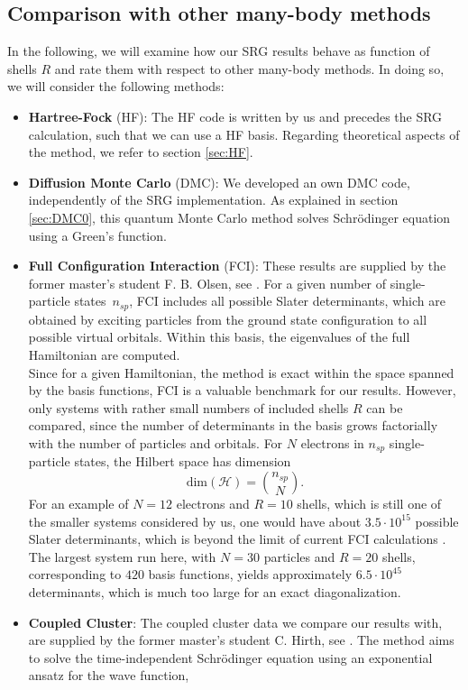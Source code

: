 \subsection{Comparison with other many-body methods}
In the following, we will examine how our SRG results behave as function of shells $R$ and rate them with respect to other many-body methods. In doing so, we will consider the following methods: 
\begin{itemize}
\item \textbf{Hartree-Fock} (HF): The HF code is written by us and precedes the SRG calculation, such that we can use a HF basis. Regarding theoretical aspects of the method, we refer to section \ref{sec:HF}.
\item \textbf{Diffusion Monte Carlo} (DMC): We developed an own DMC code, independently of the SRG implementation. As explained in section \ref{sec:DMC0}, this quantum Monte Carlo method solves Schr\"odinger equation using a Green's function.
\item \textbf{Full Configuration Interaction} (FCI): These results are supplied by the former master's student F. B. Olsen, see \cite{Frank}. For a given number of single-particle \mbox{states $n_{sp}$}, FCI includes all  possible Slater determinants, which are obtained by exciting
 particles from the ground state configuration to all possible virtual orbitals.  Within this basis, the eigenvalues of the full Hamiltonian are computed. \\
 Since for a given Hamiltonian, the method is exact within the space spanned by the basis functions, FCI is a valuable benchmark for our results. However, only systems with rather small numbers of included shells $R$ can be compared, since the number of determinants in the basis grows factorially with the number of particles and orbitals. For $N$ electrons in $n_{sp}$ single-particle states, the Hilbert space has dimension
 \[
 \text{dim}(\mathcal{H}) = \binom{n_{sp}}{N}.
 \]
For an example of $N=12$ electrons and $R=10$ shells, which is still one of the smaller systems considered by us, one would have about $3.5\cdot 10^{15}$ possible Slater determinants, which is beyond the limit of current FCI calculations \cite{Shimizu:2012rt}. The largest system run here, with $N=30$ particles and $R=20$ shells, corresponding to $420$ basis functions, yields approximately $6.5\cdot 10^{45}$ determinants, which is much too large for an exact diagonalization.
\item \textbf{Coupled Cluster}: The coupled cluster data we compare our results with, are supplied by the former master's student C. Hirth, see \cite{Christoffer}. The method aims to solve the time-independent Schr\"odinger equation using an exponential ansatz for the wave function,

\end{itemize}
